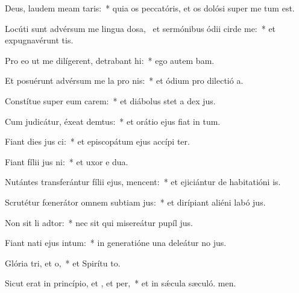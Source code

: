 \item Deus, laudem meam  taris:~* quia os peccatóris, et os dolósi super me tum est.
\item Locúti sunt advérsum me lingua dosa,~\pscross{} et sermónibus ódii cirde me:~* et expugnavérunt  tis.
\item Pro eo ut me dilígerent, detrabant hi:~* ego autem bam.
\item Et posuérunt advérsum me la pro nis:~* et ódium pro dilectió a.
\item Constítue super eum carem:~* et diábolus stet a dex jus.
\item Cum judicátur, éxeat demtus:~* et orátio ejus fiat in tum.
\item Fiant dies jus ci:~* et episcopátum ejus accípi ter.
\item Fiant fílii jus ni:~* et uxor e dua.
\item Nutántes transferántur fílii ejus,  mencent:~* et ejiciántur de habitatióni is.
\item Scrutétur fœnerátor omnem subtiam jus:~* et dirípiant aliéni labó jus.
\item Non sit li adtor:~* nec sit qui misereátur pupíl jus.
\item Fiant nati ejus  intum:~* in generatióne una deleátur no jus.
\item Glória tri, et o,~* et Spirítu to.
\item Sicut erat in princípio, et , et per,~* et in sǽcula sæculó. men.
